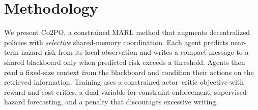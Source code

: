 \documentclass{article}
\theoremstyle{plain}
\theoremstyle{definition}
\theoremstyle{remark}
\begin{document}



\section{Methodology}
\label{sec:method}

We present Co2PO, a constrained MARL method that augments decentralized policies with \emph{selective} shared-memory coordination.
Each agent predicts near-term hazard risk from its local observation and writes a compact message to a shared blackboard only when predicted risk exceeds a threshold.
Agents then read a fixed-size context from the blackboard and condition their actions on the retrieved information.
Training uses a constrained actor--critic objective with reward and cost critics, a dual variable for constraint enforcement, supervised hazard forecasting, and a penalty that discourages excessive writing.
\end{document}
